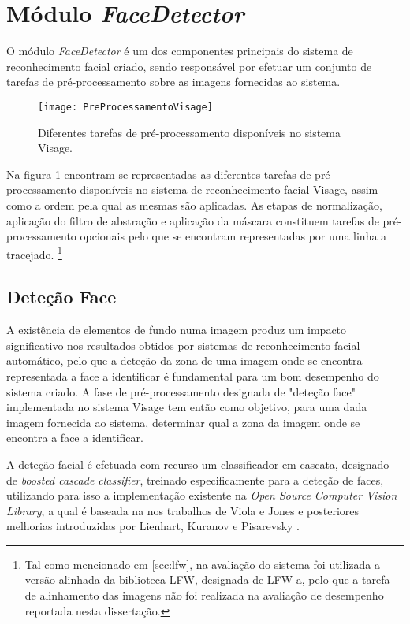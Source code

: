 \section{Módulo \textit{FaceDetector}} \label{sec:facedetector}
O módulo \textit{FaceDetector} é um dos componentes principais do sistema de reconhecimento facial criado, sendo responsável por efetuar um conjunto de tarefas de pré-processamento sobre as imagens fornecidas ao sistema.

\begin{figure}[t]
  \begin{center}
    \leavevmode
    \texttt{[image: PreProcessamentoVisage]}
    \caption{Diferentes tarefas de pré-processamento disponíveis no sistema Visage.}
    \label{fig:preprocessamento}
  \end{center}
\end{figure}


Na figura \ref{fig:preprocessamento} encontram-se representadas as diferentes tarefas de pré-processamento disponíveis no sistema de reconhecimento facial Visage, assim como a ordem pela qual as mesmas são aplicadas. As etapas de normalização, aplicação do filtro de abstração e aplicação da máscara constituem tarefas de pré-processamento opcionais pelo que se encontram representadas por uma linha a tracejado. \footnote{Tal como mencionado em \ref{sec:lfw}, na avaliação do sistema foi utilizada a versão alinhada da biblioteca LFW, designada de LFW-a, pelo que a tarefa de alinhamento das imagens não foi realizada na avaliação de desempenho reportada nesta dissertação.}

\subsection{Deteção Face} \label{sec:detecao_face}
A existência de elementos de fundo numa imagem produz um impacto significativo nos resultados obtidos por sistemas de reconhecimento facial automático, pelo que a deteção da zona de uma imagem onde se encontra representada a face a identificar é fundamental para um bom desempenho do sistema criado. A fase de pré-processamento designada de "deteção face" implementada no sistema Visage tem então como objetivo, para uma dada imagem fornecida ao sistema, determinar qual a zona da imagem onde se encontra a face a identificar.

A deteção facial é efetuada com recurso um classificador em cascata, designado de \textit{boosted cascade classifier},  treinado especificamente para a deteção de faces, utilizando para isso a implementação existente na \textit{Open Source Computer Vision Library}, a qual é baseada na nos trabalhos de Viola e Jones \cite{Viola2001} e posteriores melhorias introduzidas por Lienhart, Kuranov e Pisarevsky \cite{Lienhart2003}.

